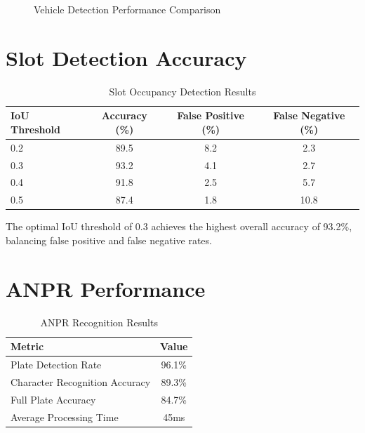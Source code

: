 \documentclass[12pt,a4paper]{report}
\begin{document}
\begin{figure}[H]
\centering
{}
\caption{Vehicle Detection Performance Comparison}
\label{fig:detection_results}
\end{figure}

\section{Slot Detection Accuracy}

\begin{table}[H]
\centering
\caption{Slot Occupancy Detection Results}
\begin{tabular}{|l|c|c|c|}
\hline
\textbf{IoU Threshold} & \textbf{Accuracy (\%)} & \textbf{False Positive (\%)} & \textbf{False Negative (\%)} \\
\hline
0.2 & 89.5 & 8.2 & 2.3 \\
\hline
0.3 & 93.2 & 4.1 & 2.7 \\
\hline
0.4 & 91.8 & 2.5 & 5.7 \\
\hline
0.5 & 87.4 & 1.8 & 10.8 \\
\hline
\end{tabular}
\end{table}

The optimal IoU threshold of 0.3 achieves the highest overall accuracy of 93.2\%, balancing false positive and false negative rates.

\section{ANPR Performance}

\begin{table}[H]
\centering
\caption{ANPR Recognition Results}
\begin{tabular}{|l|c|}
\hline
\textbf{Metric} & \textbf{Value} \\
\hline
Plate Detection Rate & 96.1\% \\
\hline
Character Recognition Accuracy & 89.3\% \\
\hline
Full Plate Accuracy & 84.7\% \\
\hline
Average Processing Time & 45ms \\
\hline
\end{tabular}
\end{table}
\end{document}
